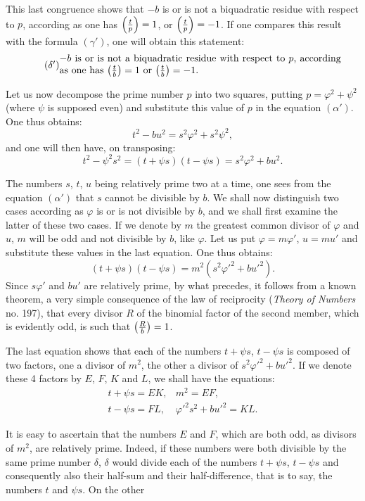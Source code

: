 \noindent
This last congruence shows that $-b$ is or is not a biquadratic residue
with respect to $p$, according as one has $\left(\frac{t}{p}\right)=1$, or $\left(\frac{t}{p}\right)=-1$. If one compares
this result with the formula $(\gamma')$, one will obtain this statement:
\begin{equation*}\tag{$\delta'$}
\begin{minipage}{0.83\textwidth}
$-b$ is or is not a biquadratic residue with respect to $p$, according
as one has $\leg{t}{b}=1$ or $\leg{t}{b}=-1$.
\end{minipage}
\end{equation*}
\par\indent
Let us now decompose the prime number $p$ into two squares, putting
$p=\varphi^2+\psi^2$ (where $\psi$ is supposed even) and substitute this value of $p$ in
the equation $(\alpha')$. One thus obtains:
\[
t^2-bu^2=s^2\varphi^2+s^2\psi^2,
\]
and one will then have, on transposing:
\[
t^2-\psi^2s^2=(t+\psi s)(t-\psi s)=s^2\varphi^2+bu^2.
\]
\par\indent
The numbers $s$, $t$, $u$ being relatively prime two at a time, one sees
from the equation $(\alpha')$ that $s$ cannot be divisible by $b$. We shall now
distinguish two cases according as $\varphi$ is or is not divisible by $b$, and we
shall first examine the latter of these two cases. If we denote by
$m$ the greatest common divisor of $\varphi$ and $u$, $m$ will be odd and not divisible
by $b$, like $\varphi$. Let us put $\varphi=m\varphi'$, $u=mu'$ and substitute these values in
the last equation. One thus obtains:
\[
(t+\psi s)(t-\psi s)=m^2(s^2\varphi'^2+bu'^2).
\]
Since $s\varphi'$ and $bu'$ are relatively prime, by what precedes, it follows
from a known theorem, a very simple consequence of the law of reciprocity (\emph{Theory
of Numbers} no. 197), that every divisor $R$ of the binomial factor of the second member,
which is evidently odd, is such that $\left(\frac{R}{b}\right)=1$.
\par\indent
The last equation shows that each of the numbers $t+\psi s$, $t-\psi s$
is composed of two factors, one a divisor of $m^2$, the other a divisor of $s^2\varphi'^2+bu'^2$.
If we denote these 4 factors by $E$, $F$, $K$ and $L$, we shall have the equations:
\[
\begin{array}{ll}
t+\psi s=EK,&m^2=EF,\\
t-\psi s=FL,&\varphi'^2s^2+bu'^2=KL.
\end{array}
\]
\par\indent
It is easy to ascertain that the numbers $E$ and $F$, which are both odd,
as divisors of $m^2$, are relatively prime. Indeed, if these
numbers were both divisible by the same prime number $\delta$, $\delta$
would divide each of the numbers $t+\psi s$, $t-\psi s$ and consequently also their half-sum
and their half-difference, that is to say, the numbers $t$ and $\psi s$. On the other
